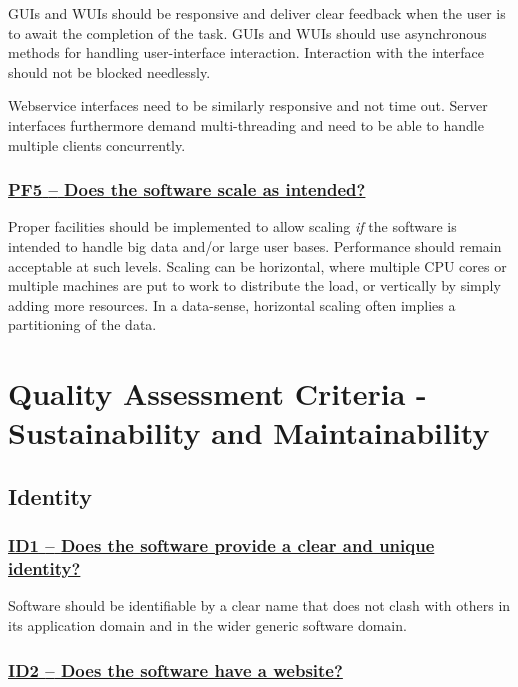 \documentclass[a4paper,11pt]{article}
\newcommand{\indicator}[1]{\subsubsection*{\underline{#1}}}
\begin{document}
GUIs and WUIs should be responsive and deliver clear feedback when the user is
to await the completion of the task. GUIs and WUIs should use asynchronous methods for
handling user-interface interaction. Interaction with the interface should not
be blocked needlessly.

Webservice interfaces need to be similarly responsive and not time out. Server interfaces furthermore demand multi-threading and need to be able to handle
multiple clients concurrently.

\newcommand{\pfFiveName}{PF5}
\newcommand{\pfFiveID}{\pfFiveName}
\newcommand{\pfFiveText}{Does the software scale as intended?}
\indicator{\pfFiveName{ }--{ }\pfFiveText}\label{id:pf5} 

Proper facilities should be implemented to allow scaling \emph{if} the software is
intended to handle big data and/or large user bases. Performance should remain
acceptable at such levels.  Scaling can be horizontal, where multiple CPU cores
or multiple machines are put to work to distribute the load, or vertically by
simply adding more resources. In a data-sense, horizontal scaling often implies
a partitioning of the data.

\section{Quality Assessment Criteria - Sustainability and Maintainability}\label{sec:sustAndMaint}

\subsection{Identity}\label{sec:ide}

\newcommand{\idOneName}{ID1}
\newcommand{\idOneID}{\idOneName}
\newcommand{\idOneText}{Does the software provide a clear and unique identity?}
\indicator{\idOneName{ }--{ }\idOneText}\label{id:id1} 

Software should be identifiable by a clear name that does not clash with others
in its application domain and in the wider generic software domain. 

\newcommand{\idTwoName}{ID2}
\newcommand{\idTwoID}{\idTwoName}
\newcommand{\idTwoText}{Does the software have a website?}
\indicator{\idTwoName{ }--{ }\idTwoText}\label{id:id2} 
\end{document}
